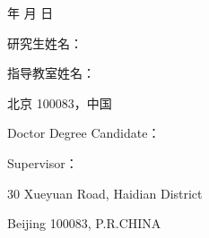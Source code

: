 {\begin{titlepage}
\begin{center}
            \ThesisYear 年 \ThesisMonth 月 \ThesisDay 日

        \end{center}
    \end{titlepage}
    \newpage

    \pagestyle{empty}
    \begin{titlepage}
        \begin{center}
            \qquad
            \vspace{10mm}

            \centerline{\ThesisTitleCN} \par    %
            \vspace{10mm}

            \centerline{\ThesisSubTitleCN} \par
            \vspace{20mm}

            \centerline{\ThesisTitleEN} \par    %
            \vspace{10mm}

            \centerline{\ThesisSubTitleEN} \par
            \vspace{40mm}

            研究生姓名：\AuthorCN \par
            \vspace{3mm}
            指导教室姓名：\TeacherCN \par
            \vspace{3mm}
            \UniversityCN \SchoolCN \par
            \vspace{3mm}
            北京 100083，中国 \par
            \vspace{8mm}

            Doctor Degree Candidate：\AuthorEN \par
            \vspace{3mm}
            Supervisor：\TeacherEN \par
            \vspace{3mm}
            \SchoolEN \par
            \vspace{3mm}
            \UniversityEN \par
            \vspace{3mm}
            30 Xueyuan Road, Haidian District \par
            \vspace{3mm}
            Beijing 100083, P.R.CHINA


\end{center}
\end{titlepage}}
